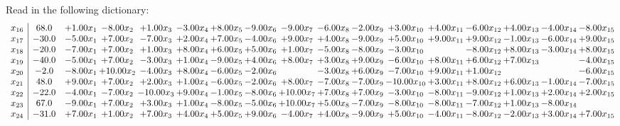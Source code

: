 \documentclass[9pt]{article}
\begin{document}
Read in the following dictionary:
\[\begin{array}{c| c c@{\hskip 2pt} c@{\hskip 2pt} c@{\hskip 2pt} c@{\hskip 2pt} c@{\hskip 2pt} c@{\hskip 2pt} c@{\hskip 2pt} c@{\hskip 2pt} c@{\hskip 2pt} c@{\hskip 2pt} c@{\hskip 2pt} c@{\hskip 2pt} c@{\hskip 2pt} c@{\hskip 2pt} c@{\hskip 2pt} }
 x_{16}   &  68.0 & +  1.00 x_{1} & -8.00 x_{2} & +  1.00 x_{3} & -3.00 x_{4} & +  8.00 x_{5} & -9.00 x_{6} & -9.00 x_{7} & -6.00 x_{8} & -2.00 x_{9} & +  3.00 x_{10} & +  4.00 x_{11} & -6.00 x_{12} & +  4.00 x_{13} & -4.00 x_{14} & -8.00 x_{15}\\
 x_{17}   &  -30.0 & -5.00 x_{1} & +  7.00 x_{2} & -7.00 x_{3} & +  2.00 x_{4} & +  7.00 x_{5} & -4.00 x_{6} & +  9.00 x_{7} & +  4.00 x_{8} & -9.00 x_{9} & +  5.00 x_{10} & +  9.00 x_{11} & +  9.00 x_{12} & -1.00 x_{13} & -6.00 x_{14} & +  9.00 x_{15}\\
 x_{18}   &  -20.0 & -7.00 x_{1} & +  7.00 x_{2} & +  1.00 x_{3} & +  8.00 x_{4} & +  6.00 x_{5} & +  5.00 x_{6} & +  1.00 x_{7} & -5.00 x_{8} & -8.00 x_{9} & -3.00 x_{10} &   & -8.00 x_{12} & +  8.00 x_{13} & -3.00 x_{14} & +  8.00 x_{15}\\
 x_{19}   &  -40.0 & -5.00 x_{1} & +  7.00 x_{2} & -3.00 x_{3} & +  1.00 x_{4} & -9.00 x_{5} & +  4.00 x_{6} & +  8.00 x_{7} & +  3.00 x_{8} & +  9.00 x_{9} & -6.00 x_{10} & +  8.00 x_{11} & +  6.00 x_{12} & +  7.00 x_{13} &   & -4.00 x_{15}\\
 x_{20}   &  -2.0 & -8.00 x_{1} & + 10.00 x_{2} & -4.00 x_{3} & +  8.00 x_{4} & -6.00 x_{5} & -2.00 x_{6} &   & -3.00 x_{8} & +  6.00 x_{9} & -7.00 x_{10} & +  9.00 x_{11} & +  1.00 x_{12} &    &   & -6.00 x_{15}\\
 x_{21}   &  48.0 & +  9.00 x_{1} & +  7.00 x_{2} & +  2.00 x_{3} & +  1.00 x_{4} & -6.00 x_{5} & -2.00 x_{6} & +  8.00 x_{7} & -7.00 x_{8} & -7.00 x_{9} & -10.00 x_{10} & +  3.00 x_{11} & +  8.00 x_{12} & +  6.00 x_{13} & -1.00 x_{14} & -7.00 x_{15}\\
 x_{22}   &  -22.0 & -4.00 x_{1} & -7.00 x_{2} & -10.00 x_{3} & +  9.00 x_{4} & -1.00 x_{5} & -8.00 x_{6} & + 10.00 x_{7} & +  7.00 x_{8} & +  7.00 x_{9} & -3.00 x_{10} & -8.00 x_{11} & -9.00 x_{12} & +  1.00 x_{13} & +  2.00 x_{14} & +  2.00 x_{15}\\
 x_{23}   &  67.0 & -9.00 x_{1} & +  7.00 x_{2} & +  3.00 x_{3} & +  1.00 x_{4} & -8.00 x_{5} & -5.00 x_{6} & + 10.00 x_{7} & +  5.00 x_{8} & -7.00 x_{9} & -8.00 x_{10} & -8.00 x_{11} & -7.00 x_{12} & +  1.00 x_{13} & -8.00 x_{14} &   \\
 x_{24}   &  -31.0 & +  7.00 x_{1} & +  1.00 x_{2} & +  7.00 x_{3} & +  4.00 x_{4} & +  5.00 x_{5} & +  9.00 x_{6} & -4.00 x_{7} & +  4.00 x_{8} & -9.00 x_{9} & +  5.00 x_{10} & -4.00 x_{11} & -8.00 x_{12} & -2.00 x_{13} & +  3.00 x_{14} & +  7.00 x_{15}\\

\end{array}\]
\end{document}
